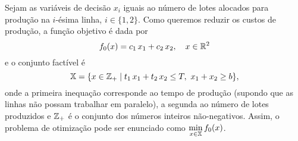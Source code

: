 
\begin{questions}

\begin{solution}
	Sejam as variáveis de decisão $x_i$ iguais ao número de lotes alocados para produção na $i$-ésima linha, $i\in\{1,2\}$. Como queremos reduzir os custos de produção, a função objetivo é dada por \[f_0(x) = c_1\,x_1+c_2\,x_2,\quad x\in{\mathbb R}^2\]
    e o conjunto factível é
    \[{\mathbb X} = \{ x\in{\mathbb Z}_+ \mid t_1\,x_1+t_2\,x_2\le T,~ x_1+x_2\ge b \},\]
    onde a primeira inequação corresponde ao tempo de produção (supondo que as linhas não possam trabalhar em paralelo), a segunda ao número de lotes produzidos e ${\mathbb Z}_+$ é o conjunto dos números inteiros não-negativos.
    Assim, o problema de otimização pode ser enunciado como
    \(\displaystyle\min_{x\in{\mathbb X}} f_0(x)\).
\end{solution}


\end{questions}
